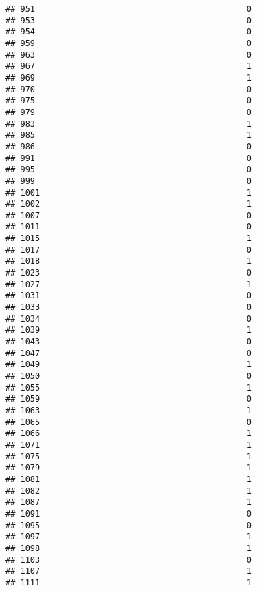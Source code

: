 \documentclass[
]{article}
\begin{document}
\begin{verbatim}
## 951                                           0
## 953                                           0
## 954                                           0
## 959                                           0
## 963                                           0
## 967                                           1
## 969                                           1
## 970                                           0
## 975                                           0
## 979                                           0
## 983                                           1
## 985                                           1
## 986                                           0
## 991                                           0
## 995                                           0
## 999                                           0
## 1001                                          1
## 1002                                          1
## 1007                                          0
## 1011                                          0
## 1015                                          1
## 1017                                          0
## 1018                                          1
## 1023                                          0
## 1027                                          1
## 1031                                          0
## 1033                                          0
## 1034                                          0
## 1039                                          1
## 1043                                          0
## 1047                                          0
## 1049                                          1
## 1050                                          0
## 1055                                          1
## 1059                                          0
## 1063                                          1
## 1065                                          0
## 1066                                          1
## 1071                                          1
## 1075                                          1
## 1079                                          1
## 1081                                          1
## 1082                                          1
## 1087                                          1
## 1091                                          0
## 1095                                          0
## 1097                                          1
## 1098                                          1
## 1103                                          0
## 1107                                          1
## 1111                                          1

\end{verbatim}
\end{document}
